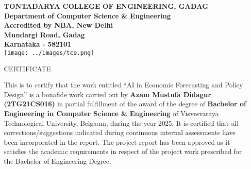 \begin{center}
    {\large \uppercase{\textbf{Tontadarya College of Engineering, Gadag}}}\\[0.15cm]
    {\large \textbf{Department of Computer Science \& Engineering}}\\[0.15cm]
    {\large \textbf{Accredited by \uppercase{NBA}, New Delhi}}\\[0.3cm]
    {\large \textbf{Mundargi Road, Gadag}}\\[0.2cm]
    {\large \textbf{Karnataka - 582101}}\\[0.3cm]

    \texttt{[image: ../images/tce.png]}
    \vspace{0.3cm}

    {\Huge \uppercase{Certificate}}\\[0.6cm]
\end{center}

\noindent This is to certify that the work entitled ``AI in Economic Forecasting and Policy Design'' is a bonafide work carried out by \textbf{Azam Mustufa Didagur (2TG21CS016)} in partial fulfillment of the award of the degree of \textbf{Bachelor of Engineering in Computer Science \& Engineering} of Visvesvaraya Technological University, Belgaum, during the year 2025. It is certified that all corrections/suggestions indicated during continuous internal assessments have been incorporated in the report. The project report has been approved as it satisfies the academic requirements in respect of the project work prescribed for the Bachelor of Engineering Degree.

\vspace{0.6cm}

